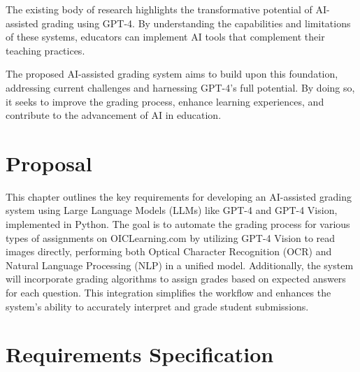 \documentclass[ms,twoside,print]{nuthesis}
\begin{document}
The existing body of research highlights the transformative potential of AI-assisted grading using GPT-4. By understanding the capabilities and limitations of these systems, educators can implement AI tools that complement their teaching practices.

The proposed AI-assisted grading system aims to build upon this foundation, addressing current challenges and harnessing GPT-4's full potential. By doing so, it seeks to improve the grading process, enhance learning experiences, and contribute to the advancement of AI in education.

\chapter{Proposal}

This chapter outlines the key requirements for developing an AI-assisted grading system using Large Language Models (LLMs) like GPT-4 and GPT-4 Vision, implemented in Python. The goal is to automate the grading process for various types of assignments on OICLearning.com by utilizing GPT-4 Vision to read images directly, performing both Optical Character Recognition (OCR) and Natural Language Processing (NLP) in a unified model. Additionally, the system will incorporate grading algorithms to assign grades based on expected answers for each question. This integration simplifies the workflow and enhances the system's ability to accurately interpret and grade student submissions.


\appendix
\chapter{Requirements Specification}

\backmatter



\end{document}

